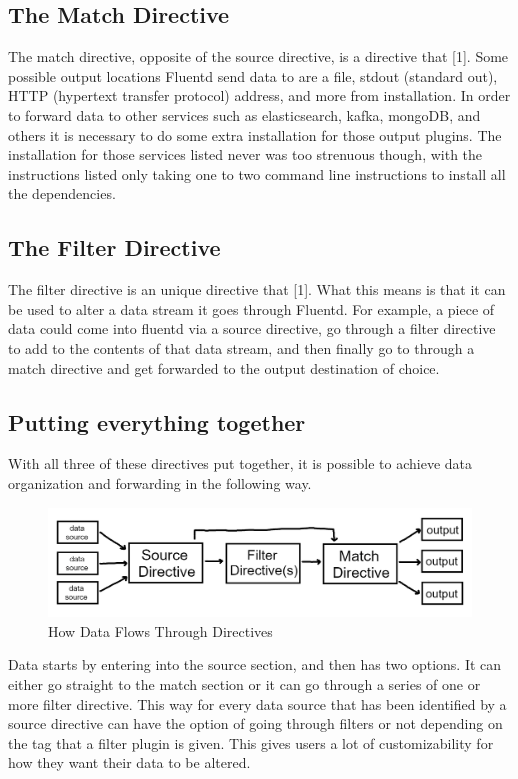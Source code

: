 \subsection{The Match Directive}
\quad \quad The match directive, opposite of the source directive, is a directive that [1]. Some possible output locations Fluentd 
send data to are a file, stdout (standard out), HTTP (hypertext transfer protocol) address, and more from installation. In order to forward data to
other services such as elasticsearch, kafka, mongoDB, and others it is necessary to do some extra installation for those output plugins. The installation for those services
listed never was too strenuous though, with the instructions listed only taking one to two command line instructions to install all the dependencies.
\subsection{The Filter Directive}
\quad \quad The filter directive is an unique directive that [1]. What this means is that it can be used to alter a data stream
it goes through Fluentd. For example, a piece of data could come into fluentd via a source directive, go through a filter directive to add to the contents of that data stream, and
then finally go to through a match directive and get forwarded to the output destination of choice.
\subsection{Putting everything together}
\quad \quad With all three of these directives put together, it is possible to achieve data organization and forwarding in the following way.
\begin{figure}[H]
    \centering
    \includegraphics[scale=1]{images/how_it_works.png}
    \caption{How Data Flows Through Directives}
    \label{fig:pic2}
\end{figure}
Data starts by entering into the source section, and then has two options. It can either go straight to the match section or it can go through a series of one or more filter directive. 
This way for every data source that has been identified by a source directive can have the option of going through filters or not depending on the tag that a filter plugin is given. This 
gives users a lot of customizability for how they want their data to be altered.
